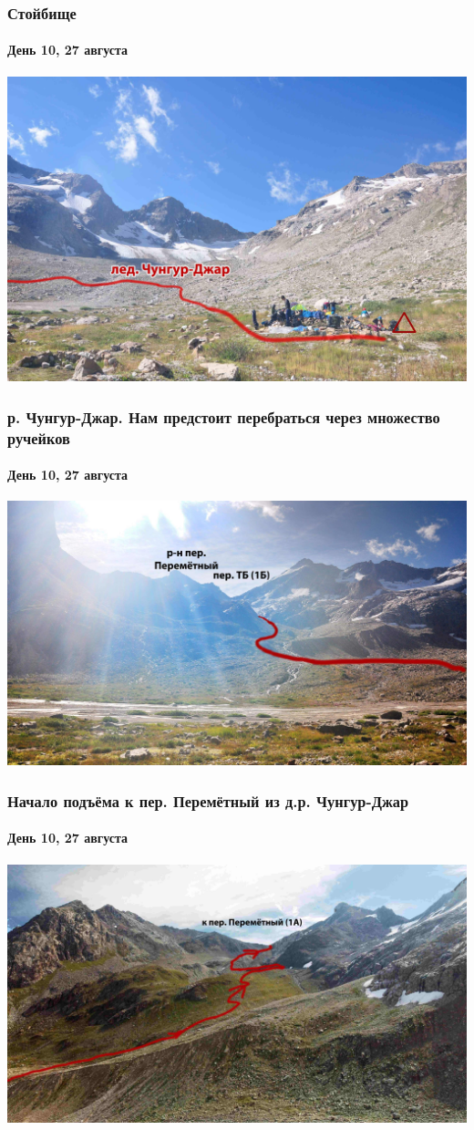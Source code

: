 \begin{frame}
	\frametitle{Стойбище}
	\framesubtitle{День 10, 27 августа}
	\centering
	\includegraphics[width=\textwidth]{../pics/DSC_0252}			
\end{frame}

\begin{frame}
	\frametitle{р. Чунгур-Джар. Нам предстоит перебраться через множество ручейков}
	\framesubtitle{День 10, 27 августа}
	\centering
	\includegraphics[width=\textwidth]{../pics/DSC_0254}			
\end{frame}

\begin{frame}
	\frametitle{Начало подъёма к пер. Перемётный из д.р. Чунгур-Джар}
	\framesubtitle{День 10, 27 августа}
	\centering
	\includegraphics[width=\textwidth]{../pics/perem_1}			
\end{frame}

